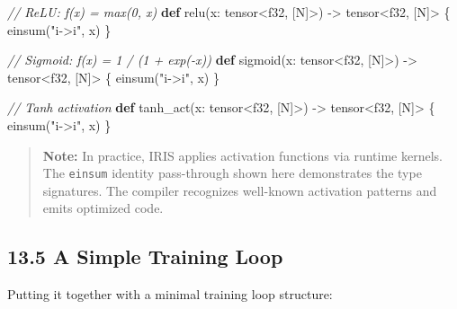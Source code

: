 \documentclass[
  english,
]{book}
\newenvironment{Shaded}{\begin{snugshade}}{\end{snugshade}}
\newcommand{\CommentTok}[1]{\textcolor[rgb]{0.42,0.60,0.33}{\textit{#1}}}
\newcommand{\DataTypeTok}[1]{\textcolor[rgb]{0.31,0.79,0.69}{#1}}
\newcommand{\FunctionTok}[1]{\textcolor[rgb]{0.86,0.86,0.67}{#1}}
\newcommand{\KeywordTok}[1]{\textcolor[rgb]{0.34,0.61,0.84}{\textbf{#1}}}
\newcommand{\NormalTok}[1]{\textcolor[rgb]{0.83,0.83,0.83}{#1}}
\newcommand{\OperatorTok}[1]{\textcolor[rgb]{0.83,0.83,0.83}{#1}}
\newcommand{\StringTok}[1]{\textcolor[rgb]{0.81,0.57,0.47}{#1}}
\begin{document}
\begin{Shaded}
\begin{Highlighting}[]
\CommentTok{// ReLU: f(x) = max(0, x)}
\KeywordTok{def}\NormalTok{ relu(x: }\DataTypeTok{tensor}\OperatorTok{\textless{}}\DataTypeTok{f32}\NormalTok{, [N]}\OperatorTok{\textgreater{}}\NormalTok{) }\OperatorTok{{-}\textgreater{}} \DataTypeTok{tensor}\OperatorTok{\textless{}}\DataTypeTok{f32}\NormalTok{, [N]}\OperatorTok{\textgreater{}}\NormalTok{ \{}
    \FunctionTok{einsum}\NormalTok{(}\StringTok{"i{-}\textgreater{}i"}\NormalTok{, x)}
\NormalTok{\}}

\CommentTok{// Sigmoid: f(x) = 1 / (1 + exp({-}x))}
\KeywordTok{def}\NormalTok{ sigmoid(x: }\DataTypeTok{tensor}\OperatorTok{\textless{}}\DataTypeTok{f32}\NormalTok{, [N]}\OperatorTok{\textgreater{}}\NormalTok{) }\OperatorTok{{-}\textgreater{}} \DataTypeTok{tensor}\OperatorTok{\textless{}}\DataTypeTok{f32}\NormalTok{, [N]}\OperatorTok{\textgreater{}}\NormalTok{ \{}
    \FunctionTok{einsum}\NormalTok{(}\StringTok{"i{-}\textgreater{}i"}\NormalTok{, x)}
\NormalTok{\}}

\CommentTok{// Tanh activation}
\KeywordTok{def}\NormalTok{ tanh\_act(x: }\DataTypeTok{tensor}\OperatorTok{\textless{}}\DataTypeTok{f32}\NormalTok{, [N]}\OperatorTok{\textgreater{}}\NormalTok{) }\OperatorTok{{-}\textgreater{}} \DataTypeTok{tensor}\OperatorTok{\textless{}}\DataTypeTok{f32}\NormalTok{, [N]}\OperatorTok{\textgreater{}}\NormalTok{ \{}
    \FunctionTok{einsum}\NormalTok{(}\StringTok{"i{-}\textgreater{}i"}\NormalTok{, x)}
\NormalTok{\}}
\end{Highlighting}
\end{Shaded}

\begin{quote}
\textbf{Note:} In practice, IRIS applies activation functions via
runtime kernels. The \texttt{einsum} identity pass-through shown here
demonstrates the type signatures. The compiler recognizes well-known
activation patterns and emits optimized code.
\end{quote}

\subsection{13.5 A Simple Training Loop}\label{a-simple-training-loop}

Putting it together with a minimal training loop structure:
\end{document}
